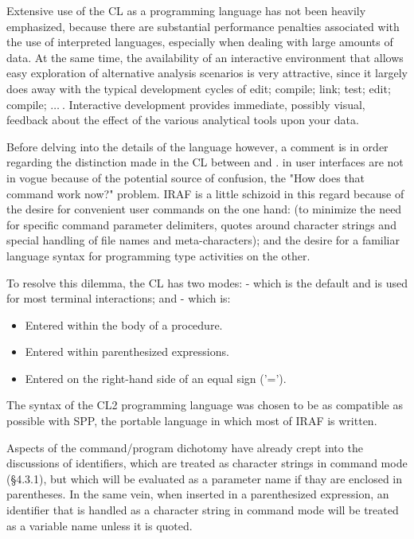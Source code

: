 Extensive use of the CL as a programming language has not been heavily
emphasized, because there are substantial performance penalties 
associated with the use of interpreted languages, especially when
dealing with large amounts of data.  At the same time, the availability
of an interactive environment that allows easy exploration of
alternative analysis scenarios is very attractive, since it largely
does away with the typical development cycles of edit; compile; link;
test; edit; compile; $\ldots~$.  Interactive development provides 
immediate, possibly visual, feedback about the effect of the various 
analytical tools upon your data. 

Before delving into the details of the language however, a comment is in
order regarding the distinction made in the CL between 
 and . 
 in user interfaces are not in vogue
because of the potential source of confusion, the  "How does that command
work now?" problem.  IRAF is a little schizoid in this regard because of the 
desire for convenient user commands on the one hand: (to minimize 
the need for specific command parameter delimiters,
quotes around character strings and special handling of 
file names and meta-characters); and the desire for
a familiar language syntax for programming type activities on the other.

To resolve this dilemma, the CL has two modes:  -
which is the default and is used for most terminal interactions; and
 - which is:

\begin{itemize}
\item Entered within the body of a procedure.
\item Entered within parenthesized expressions.
\item Entered on the right-hand side of an equal sign ('=').
\end{itemize}

\noindent
The syntax of the CL2 programming language was chosen to be as 
compatible as possible with SPP, the portable language in which 
most of IRAF is written.

Aspects of the command/program dichotomy have
already crept into the discussions of identifiers, which are treated 
as character strings in command mode (\S 4.3.1), but which will be
evaluated as a parameter name if thay are enclosed in parentheses.
In the same vein, when inserted in a parenthesized expression, 
an identifier that is handled as a character string
in command mode will be treated as a variable name unless it is quoted.  

